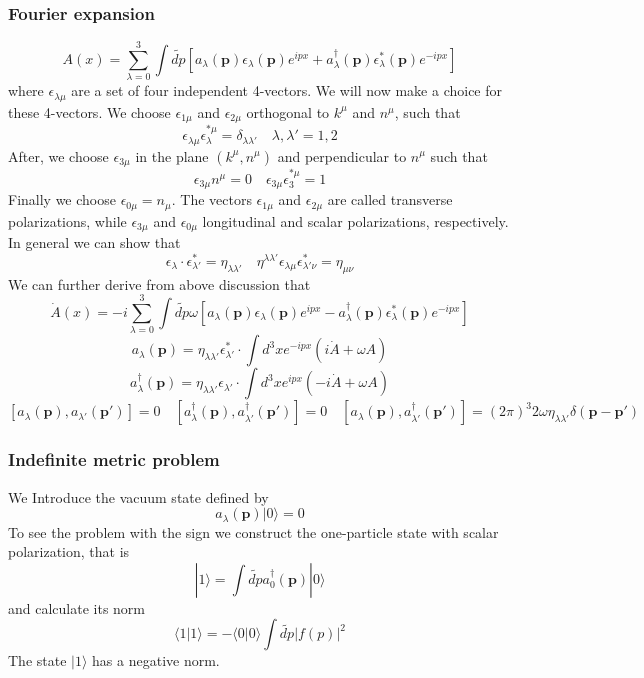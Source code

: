 \subsubsection{Fourier expansion}
\[A(x) = \sum_{\lambda=0}^{3} \int \widetilde{dp} [a_{\lambda}(\bm{p}) \epsilon_{\lambda}(\bm{p})e^{ipx} + a^{\dagger}_{\lambda}(\bm{p}) \epsilon^*_{\lambda}(\bm{p})e^{-ipx}]\]
where $\epsilon_{\lambda \mu}$ are a set of four independent 4-vectors.  We will now make a choice for these 4-vectors. We choose $\epsilon_{1\mu}$ and $\epsilon_{2\mu}$ orthogonal to $k^{\mu}$ and $n^{\mu}$, such that
\[\epsilon_{\lambda \mu} \epsilon^{*\mu}_{\lambda} = \delta_{\lambda \lambda'} \quad \lambda,\lambda' = 1,2\]
After, we choose $\epsilon_{3\mu}$ in the plane $(k^{\mu},n^{\mu})$ and perpendicular to $n^{\mu}$ such that
\[\epsilon_{3\mu} n^{\mu} = 0 \quad \epsilon_{3\mu} \epsilon^{*\mu}_{3} = 1\]
Finally we choose $\epsilon_{0\mu} = n_{\mu}$. The vectors $\epsilon_{1\mu}$ and $\epsilon_{2\mu}$ are called transverse polarizations, while $\epsilon_{3\mu}$ and $\epsilon_{0\mu}$ longitudinal and scalar polarizations, respectively.\\
In general we can show that
\[\epsilon_{\lambda} \cdot \epsilon^*_{\lambda'} = \eta_{\lambda \lambda'} \quad \eta^{\lambda \lambda'} \epsilon_{\lambda \mu} \epsilon^*_{\lambda' \nu} = \eta_{\mu \nu} \]
We can further derive from above discussion that
\[\dot{A}(x) = -i \sum_{\lambda=0}^{3} \int \widetilde{dp} \omega [a_{\lambda}(\bm{p}) \epsilon_{\lambda}(\bm{p})e^{ipx} - a^{\dagger}_{\lambda}(\bm{p}) \epsilon^*_{\lambda}(\bm{p})e^{-ipx}]\]
\[ a_{\lambda}(\bm{p}) =  \eta_{\lambda \lambda'} \epsilon^*_{\lambda'} \cdot \int d^3x e^{-ipx}(i\dot{A}+\omega A)\]
\[ a^{\dagger}_{\lambda}(\bm{p}) =  \eta_{\lambda \lambda'} \epsilon_{\lambda'} \cdot \int d^3x e^{ipx}(-i\dot{A}+\omega A)\]
\[[a_{\lambda}(\bm{p}),a_{\lambda'}(\bm{p'})] = 0 \quad [a^{\dagger}_{\lambda}(\bm{p}),a^{\dagger}_{\lambda'}(\bm{p'})] = 0 \quad [a_{\lambda}(\bm{p}),a^{\dagger}_{\lambda'}(\bm{p'})] = (2\pi)^3 2\omega \eta_{\lambda \lambda'} \delta(\bm{p} - \bm{p}')\]

\subsubsection{Indefinite metric problem}
We Introduce the vacuum state defined by
\[a_{\lambda}(\bm{p}) | 0 \rangle = 0\]
To see the problem with the sign we construct the one-particle state with scalar polarization, that is
\[|1\rangle = \int \widetilde{dp} a^{\dagger}_{0}(\bm{p})|0\rangle
\]
and calculate its norm
\[\langle 1 | 1 \rangle = -\langle 0 | 0 \rangle \int \widetilde{dp} |f(p)|^2\]
The state $| 1 \rangle$ has a negative norm.

